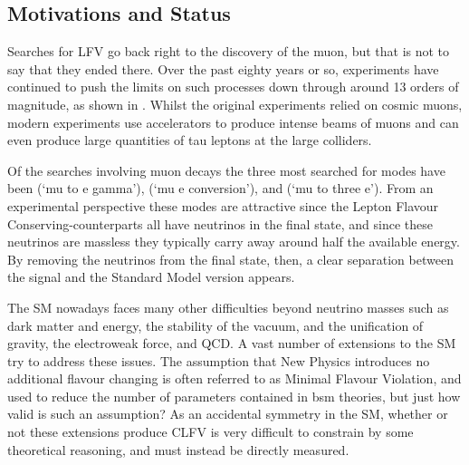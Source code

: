 \subsection{Motivations and Status}
Searches for \ac{LFV} go back right to the discovery of the muon, but that is not to say that they ended there.
Over the past eighty years or so, experiments have continued to push the limits on such processes down through around 13 orders of magnitude, as shown in .
Whilst the original experiments relied on cosmic muons, modern experiments use accelerators to produce 
intense beams of muons and can even produce large quantities of tau leptons at the large colliders.
\FigTheoryMuLFVLimits

Of the searches involving muon decays the three most searched for modes have been \mueg (`mu to e gamma'), \muec (`mu e conversion'), and \muThreeE (`mu to three e').
From an experimental perspective these modes are attractive since the Lepton Flavour Conserving-counterparts all have neutrinos in the final state, and since these neutrinos are massless they typically carry away around half the available energy.
By removing the neutrinos from the final state, then, a clear separation between the signal and the Standard Model version appears.

The \ac{SM} nowadays faces many other difficulties beyond neutrino masses such as dark matter and energy, the stability of the vacuum, and the unification of gravity, the electroweak force, and \ac{QCD}.
A vast number of extensions to the \ac{SM} try to address these issues.
The assumption that New Physics introduces no additional flavour changing is often referred to as Minimal Flavour Violation, and used to reduce the number of parameters contained in \ac{bsm} theories, but just how valid is such an assumption?
As an accidental symmetry in the \ac{SM}, whether or not these extensions produce \ac{CLFV} is very difficult to constrain by some theoretical reasoning, and must instead be directly measured.

